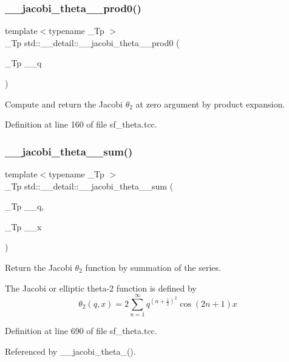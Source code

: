 \subsubsection{\texorpdfstring{\+\_\+\+\_\+jacobi\+\_\+theta\+\_\+\_\+prod0()}{\_\_jacobi\_theta\_2\_prod0()}}
{\footnotesize\ttfamily template$<$typename \+\_\+\+Tp $>$ \\
\+\_\+\+Tp std\+::\+\_\+\+\_\+detail\+::\+\_\+\+\_\+jacobi\+\_\+theta\+\_\+\_\+prod0 (\begin{DoxyParamCaption}\item[{\+\_\+\+Tp}]{\+\_\+\+\_\+q }\end{DoxyParamCaption})}

Compute and return the Jacobi $ \theta_2 $ at zero argument by product expansion. 

Definition at line 160 of file sf\+\_\+theta.\+tcc.

\mbox{\label{namespacestd_1_1____detail_a6eba88f5f854974b7fe7445e9b11a0e0}} 
\subsubsection{\texorpdfstring{\+\_\+\+\_\+jacobi\+\_\+theta\+\_\+\_\+sum()}{\_\_jacobi\_theta\_2\_sum()}}
{\footnotesize\ttfamily template$<$typename \+\_\+\+Tp $>$ \\
\+\_\+\+Tp std\+::\+\_\+\+\_\+detail\+::\+\_\+\+\_\+jacobi\+\_\+theta\+\_\+\_\+sum (\begin{DoxyParamCaption}\item[{\+\_\+\+Tp}]{\+\_\+\+\_\+q,  }\item[{\+\_\+\+Tp}]{\+\_\+\+\_\+x }\end{DoxyParamCaption})}

Return the Jacobi $ \theta_2 $ function by summation of the series.

The Jacobi or elliptic theta-\/2 function is defined by \[ \theta_2(q,x) = 2\sum_{n=1}^{\infty} q^{(n+\frac{1}{2})^2}\cos{(2n+1)x} \] 

Definition at line 690 of file sf\+\_\+theta.\+tcc.



Referenced by \+\_\+\+\_\+jacobi\+\_\+theta\+\_().

